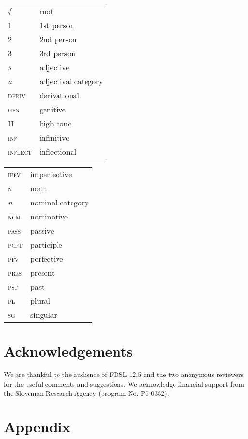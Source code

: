 \documentclass[output=paper]{langsci/langscibook}
\begin{document}
\begin{tabularx}{.45\textwidth}{@{}lX@{}}
\textsc{\textsc{√}}&root\\
\textsc{1}&1st person\\
\textsc{2}&2nd person\\
\textsc{3}&3rd person\\
\textsc{a}&adjective\\
\textit{\textit{a}}&adjectival category\\
\textsc{deriv}&derivational\\
\textsc{gen}&genitive\\
\textsc{H}&high tone\\
\textsc{inf}&infinitive\\
\textsc{inflect}&inflectional\\
\end{tabularx}
\begin{tabularx}{.45\textwidth}{@{}lX@{}}
\textsc{\textsc{ipfv}}&imperfective\\
\textsc{n}&noun\\
\textit{\textit{n}}&nominal category\\
\textsc{nom}&nominative\\
\textsc{\textsc{pass}}&passive\\
\textsc{\textsc{pcpt}}&participle\\
\textsc{\textsc{pfv}}&perfective\\
\textsc{\textsc{pres}}&present\\
\textsc{\textsc{pst}}&past\\
\textsc{pl}&plural\\
\textsc{sg}&singular\\
\end{tabularx}

\section*{Acknowledgements}

We are thankful to the audience of FDSL 12.5 and the two anonymous reviewers for the useful comments and suggestions. We acknowledge financial support from the Slovenian Research Agency (program No. P6-0382).

										
\sloppy
\printbibliography[heading=subbibliography,notkeyword=this]




\section*{Appendix}\label{secapp}
\end{document}
